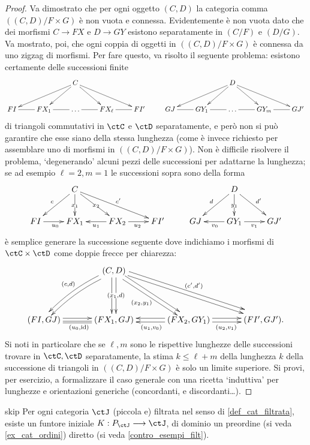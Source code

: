 \begin{proof}
	Va dimostrato che per ogni oggetto \((C,D)\) la categoria comma \(((C,D)/F\times G)\) è non vuota e connessa. Evidentemente è non vuota dato che dei morfismi \(C\to FX\) e \(D\to GY\) esistono separatamente in \((C/F)\) e \((D/G)\). Va mostrato, poi, che ogni coppia di oggetti in \(((C,D)/F\times G)\) è connessa da uno zigzag di morfismi. Per fare questo, va risolto il seguente problema: esistono certamente delle successioni finite
	\[\xymatrix@C=8mm{
		&&C\ar[dr]\ar[dl]\ar[dll]\ar[drr] &&&&& D\ar[dr]\ar[dl]\ar[dll]\ar[drr]\\
		FI\ar@{-}[r] & FX_1\ar@{-}[r] & \dots\ar@{-}[r] & FX_\ell\ar@{-}[r] & FI' & GJ\ar@{-}[r] & GY_1\ar@{-}[r] & \dots\ar@{-}[r] & GY_m\ar@{-}[r] & GJ'
		}
	\]
	di triangoli commutativi in \(\ctC\) e \(\ctD\) separatamente, e però non si può garantire che esse siano della stessa lunghezza (come è invece richiesto per assemblare uno \zzg di morfismi in \(((C,D)/F\times G)\)). Non è difficile risolvere il problema, `degenerando' alcuni pezzi delle successioni per adattarne la lunghezza; se ad esempio \(\ell=2,m=1\) le successioni sopra sono della forma
	\[\xymatrix{
		&C\ar[dr]|{x_2}\ar[dl]_{c}\ar[d]|{x_1}\ar[drr]^{c'} &&&& D\ar[d]|{y_1}\ar[dr]^{d'}\ar[dl]_d \\
		FI\ar@{->}[r]_{u_0} & FX_1\ar@{<-}[r]_{u_1} & FX_2\ar@{->}[r]_{u_2} & FI' &
		GJ\ar@{<-}[r]_{v_0} & GY_1 \ar@{->}[r]_{v_1} & GJ'
		}\]
	è semplice generare la successione seguente dove indichiamo i morfismi di \(\ctC\times\ctD\) come doppie frecce per chiarezza:
	\[\xymatrix@C=1.2cm@R=1.5cm{
		&(C,D)\ar@/_.5pc/@<.25em>[dl]\ar@/_.5pc/@<-.25em>[dl]_{(c,d)}\ar@<-.25em>[d]|\hole\ar@<.25em>[d]|{(x_1,d)}\ar@<-.25em>[dr]_{(x_2,y_1)}\ar@<.25em>[dr]\ar[drr]\ar@<.5em>[drr]^{(c',d')}\\
		(FI,GJ)\ar@<.225em>[r]\ar@<-.225em>@{=}[r]_{(u_0,\id)} & (FX_1,GJ) & (FX_2,GY_1)\ar@<.225em>[l]^{(u_1,v_0)}\ar@<-.225em>[l] \ar@<.225em>[r]\ar@<-.225em>[r]_{(u_2,v_1)} & (FI',GJ').
		}
	\]
	Si noti in particolare che se \(\ell,m\) sono le rispettive lunghezze delle successioni trovare in \(\ctC,\ctD\) separatamente, la stima \(k\le \ell+m\) della lunghezza \(k\)	della successione di triangoli in \(((C,D)/F\times G)\) è solo un limite superiore. Si provi, per esercizio, a formalizzare il caso generale con una ricetta `induttiva' per lunghezze e orientazioni generiche (concordanti, e discordanti\dots).
\end{proof}
\begin{hTheorem}{skip}
	Per ogni categoria \(\ctJ\) (piccola e) filtrata nel senso di \ref{def_cat_filtrata}, esiste un funtore iniziale \(K : P_\ctJ\fun\ctJ\), di dominio un preordine (si veda \ref{ex_cat_ordini}) diretto (si veda \ref{contro_esempi_filt}).
\end{hTheorem}
